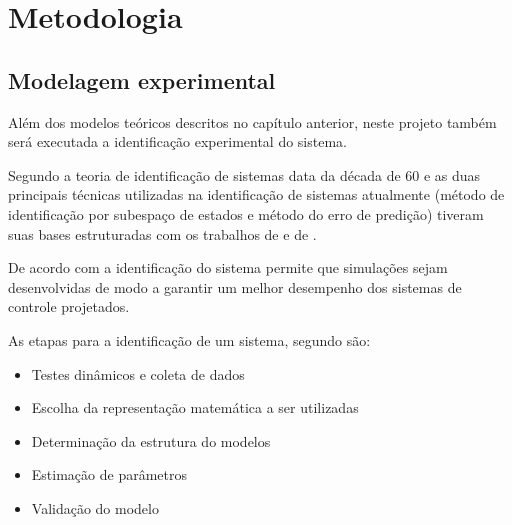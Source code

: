 
\chapter{Metodologia}
\label{ch:metodologia}

\section{Modelagem experimental}
\label{sec:modelagem_experimental}

Além dos modelos teóricos descritos no capítulo anterior, neste projeto também será executada a identificação
experimental do sistema.

Segundo  a teoria de identificação de sistemas data da década de 60 e as duas
principais técnicas utilizadas na identificação de sistemas atualmente (método de identificação por
subespaço de estados e método do erro de predição) tiveram suas bases estruturadas com os trabalhos
de  e de .

De acordo com  a identificação do sistema permite que simulações
sejam desenvolvidas de modo a garantir um melhor desempenho dos sistemas de controle projetados.

As etapas para a identificação de um sistema, segundo  são:
\begin{itemize}
    \item Testes dinâmicos e coleta de dados
    \item Escolha da representação matemática a ser utilizadas
    \item Determinação da estrutura do modelos
    \item Estimação de parâmetros
    \item Validação do modelo
\end{itemize}

